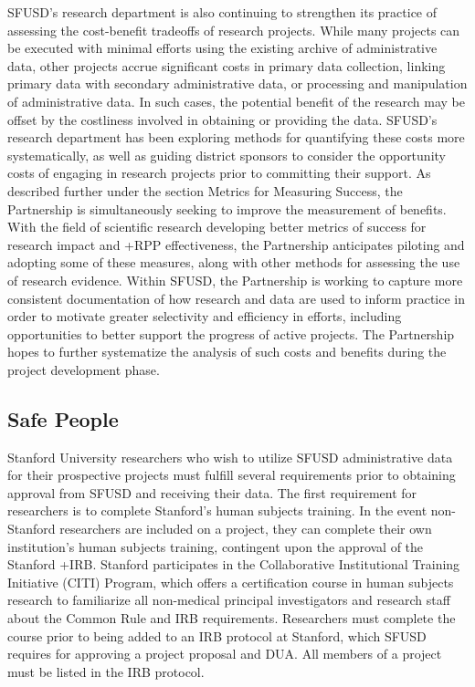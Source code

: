 \documentclass[
]{book}
\begin{document}
SFUSD's research department is also continuing to strengthen its practice of assessing the cost-benefit tradeoffs of research projects. While many projects can be executed with minimal efforts using the existing archive of administrative data, other projects accrue significant costs in primary data collection, linking primary data with secondary administrative data, or processing and manipulation of administrative data. In such cases, the potential benefit of the research may be offset by the costliness involved in obtaining or providing the data. SFUSD's research department has been exploring methods for quantifying these costs more systematically, as well as guiding district sponsors to consider the opportunity costs of engaging in research projects prior to committing their support. As described further under the section Metrics for Measuring Success, the Partnership is simultaneously seeking to improve the measurement of benefits. With the field of scientific research developing better metrics of success for research impact and +RPP\textbar{} effectiveness, the Partnership anticipates piloting and adopting some of these measures, along with other methods for assessing the use of research evidence. Within SFUSD, the Partnership is working to capture more consistent documentation of how research and data are used to inform practice in order to motivate greater selectivity and efficiency in efforts, including opportunities to better support the progress of active projects. The Partnership hopes to further systematize the analysis of such costs and benefits during the project development phase.

\hypertarget{safe-people-5}{%
\subsection{Safe People}\label{safe-people-5}}

Stanford University researchers who wish to utilize SFUSD administrative data for their prospective projects must fulfill several requirements prior to obtaining approval from SFUSD and receiving their data. The first requirement for researchers is to complete Stanford's human subjects training. In the event non-Stanford researchers are included on a project, they can complete their own institution's human subjects training, contingent upon the approval of the Stanford +IRB\textbar. Stanford participates in the Collaborative Institutional Training Initiative (CITI) Program, which offers a certification course in human subjects research to familiarize all non-medical principal investigators and research staff about the Common Rule and IRB requirements. Researchers must complete the course prior to being added to an IRB protocol at Stanford, which SFUSD requires for approving a project proposal and DUA. All members of a project must be listed in the IRB protocol.
\end{document}
